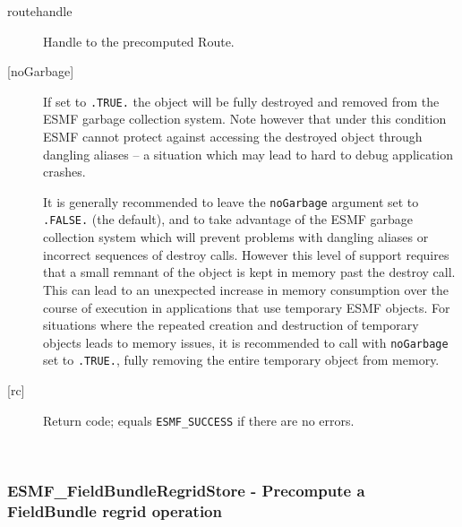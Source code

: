    \begin{description}
   \item [routehandle]
   Handle to the precomputed Route.
   \item[{[noGarbage]}]
   If set to {\tt .TRUE.} the object will be fully destroyed and removed
   from the ESMF garbage collection system. Note however that under this
   condition ESMF cannot protect against accessing the destroyed object
   through dangling aliases -- a situation which may lead to hard to debug
   application crashes.
  
   It is generally recommended to leave the {\tt noGarbage} argument
   set to {\tt .FALSE.} (the default), and to take advantage of the ESMF
   garbage collection system which will prevent problems with dangling
   aliases or incorrect sequences of destroy calls. However this level of
   support requires that a small remnant of the object is kept in memory
   past the destroy call. This can lead to an unexpected increase in memory
   consumption over the course of execution in applications that use
   temporary ESMF objects. For situations where the repeated creation and
   destruction of temporary objects leads to memory issues, it is
   recommended to call with {\tt noGarbage} set to {\tt .TRUE.}, fully
   removing the entire temporary object from memory.
   \item [{[rc]}]
   Return code; equals {\tt ESMF\_SUCCESS} if there are no errors.
   \end{description}
   
 
\mbox{}\hrulefill\ 
 
\subsubsection [ESMF\_FieldBundleRegridStore] {ESMF\_FieldBundleRegridStore - Precompute a FieldBundle regrid operation}


